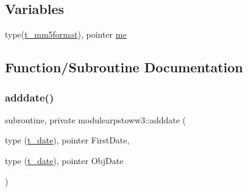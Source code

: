 \subsection*{Variables}
\begin{DoxyCompactItemize}
\item 
type(\mbox{\hyperlink{structmodulearpstoww3_1_1t__mm5format}{t\+\_\+mm5format}}), pointer \mbox{\hyperlink{namespacemodulearpstoww3_ae048aea87bb0343812cdb60ee1a1f6b8}{me}}
\end{DoxyCompactItemize}


\subsection{Function/\+Subroutine Documentation}
\mbox{\label{namespacemodulearpstoww3_a81436aea40d31bddb32f553e227a991d}} 
\subsubsection{\texorpdfstring{adddate()}{adddate()}}
{\footnotesize\ttfamily subroutine, private modulearpstoww3\+::adddate (\begin{DoxyParamCaption}\item[{type (\mbox{\hyperlink{structmodulearpstoww3_1_1t__date}{t\+\_\+date}}), pointer}]{First\+Date,  }\item[{type (\mbox{\hyperlink{structmodulearpstoww3_1_1t__date}{t\+\_\+date}}), pointer}]{Obj\+Date }\end{DoxyParamCaption})\hspace{0.3cm}{\ttfamily [private]}}

